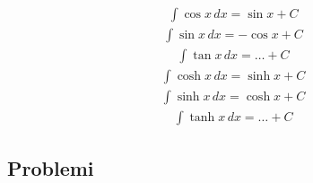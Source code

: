 \documentclass[letterpaper,10pt,english]{jupyterBook}
\begin{document}
\begin{equation*}
\end{equation*}\begin{equation*}
\begin{split}\int \cos x \, dx = \sin x + C\end{split}
\end{equation*}\begin{equation*}
\begin{split}\int \sin x \, dx =-\cos x + C\end{split}
\end{equation*}\begin{equation*}
\begin{split}\int \tan x \, dx = \dots + C\end{split}
\end{equation*}\begin{equation*}
\begin{split}\int \cosh x \, dx = \sinh x + C\end{split}
\end{equation*}\begin{equation*}
\begin{split}\int \sinh x \, dx = \cosh x + C\end{split}
\end{equation*}\begin{equation*}
\begin{split}\int \tanh x \, dx = \dots + C\end{split}
\end{equation*}
\sphinxstepscope


\subsection{Problemi}
\label{\detokenize{ch/infinitesimal_calculus/integrals-problems:problemi}}\label{\detokenize{ch/infinitesimal_calculus/integrals-problems:infinitesimal-calculus-integrals-problems}}\label{\detokenize{ch/infinitesimal_calculus/integrals-problems::doc}}
\end{document}
